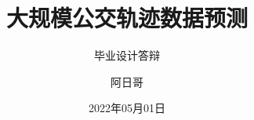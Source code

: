 \documentclass[aspectratio=169]{beamer}
\author{阿日哥}
\title{大规模公交轨迹数据预测}
\subtitle{毕业设计答辩}
\institute{武汉大学计算机学院}
\date{2022年05月01日}
\begin{document}
\kaishu






\end{document}
